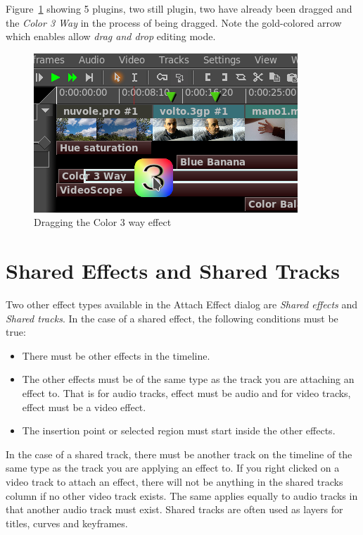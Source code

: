 Figure~\ref{fig:drag-effect} showing 5 plugins, two still plugin, two have already been dragged and the \textit{Color 3 Way} in the process of being dragged. Note the gold-colored arrow which enables allow \textit{drag and drop} editing mode.

\begin{figure}[htpb]
    \centering
    \includegraphics[width=0.7\linewidth]{images/drag-effect.png}
    \caption{Dragging the Color 3 way effect}
    \label{fig:drag-effect}
\end{figure}

\section{Shared Effects and Shared Tracks}%
\label{sec:shared_effect_tracks}

Two other effect types available in the Attach Effect dialog are \textit{Shared effects} and \textit{Shared tracks}. In the case of a shared effect, the following conditions must be true:

\begin{itemize}[noitemsep]
    \item There must be other effects in the timeline.
    \item The other effects must be of the same type as the track you are attaching an effect to. That is for audio tracks, effect must be audio and for video tracks, effect must be a video effect.
    \item The insertion point or selected region must start inside the other effects.
\end{itemize}

In the case of a shared track, there must be another track on the timeline of the same type as the track you are applying an effect to. If you right clicked on a video track to attach an effect, there will not be anything in the shared tracks column if no other video track exists. The same applies equally to audio tracks in that another audio track must exist. Shared tracks are often used as layers for titles, curves and keyframes.

